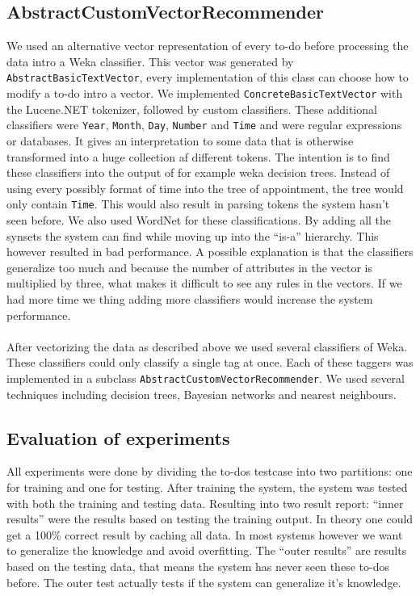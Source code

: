 \documentclass[a4paper,titlepage]{article}
\begin{document}
\subsection{AbstractCustomVectorRecommender}
We used an alternative vector representation of every to-do before processing the data intro a Weka classifier. This vector was generated by \texttt{AbstractBasicTextVector}, every implementation of this class can choose how to modify a to-do intro a vector. We implemented \texttt{ConcreteBasicTextVector} with the Lucene.NET tokenizer, followed by custom classifiers. These additional classifiers were \texttt{Year}, \texttt{Month}, \texttt{Day}, \texttt{Number} and \texttt{Time} and were regular expressions or databases. It gives an interpretation to some data that is otherwise transformed into a huge collection af different tokens. The intention is to find these classifiers into the output of for example weka decision trees. Instead of using every possibly format of time into the tree of appointment, the tree would only contain \texttt{Time}. This would also result in parsing tokens the system hasn't seen before. We also used WordNet for these classifications. By adding all the synsets the system can find while moving up into the ``is-a'' hierarchy. This however resulted in bad performance. A possible explanation is that the classifiers generalize too much and because the number of attributes in the vector is multiplied by three, what makes it difficult to see any rules in the vectors. If we had more time we thing adding more classifiers would increase the system performance.
\paragraph{}
After vectorizing the data as described above we used several classifiers of Weka. These classifiers could only classify a single tag at once. Each of these taggers was implemented in a subclass \texttt{AbstractCustomVectorRecommender}. We used several techniques including decision trees, Bayesian networks and nearest neighbours.
\subsection{Evaluation of experiments}
All experiments were done by dividing the to-dos testcase into two partitions: one for training and one for testing. After training the system, the system was tested with both the training and testing data. Resulting into two result report: ``inner results'' were the results based on testing the training output. In theory one could get a 100\% correct result by caching all data. In most systems however we want to generalize the knowledge and avoid overfitting. The ``outer results'' are results based on the testing data, that means the system has never seen these to-dos before. The outer test actually tests if the system can generalize it's knowledge.
\end{document}

